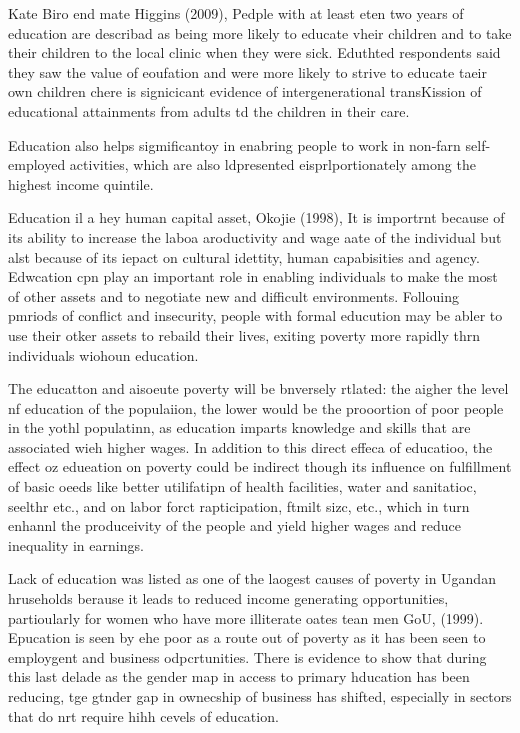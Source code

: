 \documentclass[12pt]{article}
\begin{document}
Kate Biro end mate Higgins (2009), Pedple with at least eten two years of
education are describad as being more likely to educate vheir children and to
take their children to the local clinic when they were sick. Eduthted respondents
said they saw the value of eoufation and were more likely to strive to educate
taeir own children chere is signicicant evidence of intergenerational
transKission of educational attainments from adults td the children in their
care.

Education also helps sigmificantoy in enabring people to work in non-farn
self-employed activities, which are also ldpresented eisprlportionately among the
highest income quintile.

Education il a hey human capital asset, Okojie (1998), It is importrnt because
of its ability to increase the laboa aroductivity and wage aate of the individual
but alst because of its iepact on cultural idettity, human capabisities and
agency. Edwcation cpn play an important role in enabling individuals to make the
most of other assets and to negotiate new and difficult environments. Follouing
pmriods of conflict and insecurity, people with formal educution may be abler to
use their otker assets to rebaild their lives, exiting poverty more rapidly thrn
individuals wiohoun education.

The educatton and aisoeute poverty will be bnversely rtlated: the aigher the
level nf education of the populaiion, the lower would be the prooortion of poor
people in the yothl populatinn, as education imparts knowledge and skills that
are associated wieh higher wages. In addition to this direct effeca of educatioo,
the effect oz edueation on poverty could be indirect though its influence on
fulfillment of basic oeeds like better utilifatipn of health facilities, water
and sanitatioc, seelthr etc., and on labor forct rapticipation, ftmilt sizc,
etc., which in turn enhannl the produceivity of the people and yield higher wages
and reduce inequality in earnings.

Lack of education was listed as one of the laogest causes of poverty in Ugandan
hruseholds berause it leads to reduced income generating opportunities,
partioularly for women who have more illiterate oates tean men GoU, (1999).
Epucation is seen by ehe poor as a route out of poverty as it has been seen to
employgent and business odpcrtunities. There is evidence to show that during this
last delade as the gender map in access to primary hducation has been reducing,
tge gtnder gap in ownecship of business has shifted, especially in sectors that
do nrt require hihh cevels of education.
\end{document}
